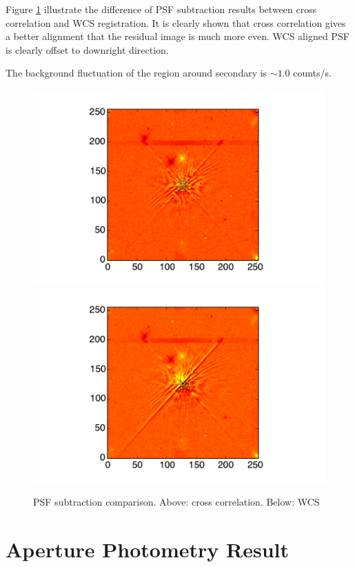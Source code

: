 \documentclass[paper=letter, fontsize=11pt]{scrartcl} %
\numberwithin{equation}{section} %
\numberwithin{figure}{section} %
\numberwithin{table}{section} %
\begin{document}
Figure \ref{fig:subcomp} illustrate the difference of PSF subtraction
results between cross correlation and WCS registration. It is clearly
shown that cross correlation gives a better alignment that the
residual image is much more even. WCS aligned PSF is clearly offset to
downright direction.\par

The background fluctuation of the region around secondary is $\sim
1.0$ counts/s.\par

\begin{figure}
  \centering
  \includegraphics[width=\textwidth]{cc_example}
  \includegraphics[width=\textwidth]{wcs_example}
  \caption{PSF subtraction comparison. Above: cross
    correlation. Below: WCS}\label{fig:subcomp}
\end{figure}
\section{Aperture Photometry Result}
\end{document}
